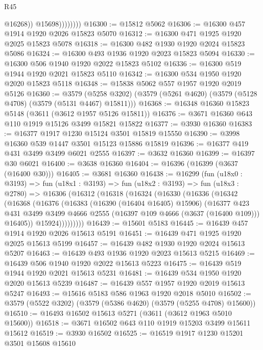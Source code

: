 \begin{lexlean}{R45}
\begin{coremodule}
                        @16268))
                    @15698))))))))
@16300 := @15812 @5062
@16306 := @16300 @457 @1914 @1920 @2026 @15823 @5070
@16312 := @16300 @471 @1925 @1920 @2025 @15823 @5078
@16318 := @16300 @482 @1930 @1920 @2024 @15823 @5086
@16324 := @16300 @493 @1936 @1920 @2023 @15823 @5094
@16330 := @16300 @506 @1940 @1920 @2022 @15823 @5102
@16336 := @16300 @519 @1944 @1920 @2021 @15823 @5110
@16342 := @16300 @534 @1950 @1920 @2020 @15823 @5118
@16348 := @15838 @5062 @557 @1957 @1920 @2019 @5126
@16360 := @3579
    (@5258 @3202)
    (@3579 (@5261 @4620) (@3579 (@5128 @4708) (@3579 (@5131 @4467) @15811)))
@16368 := @16348 @16360 @15823 @5148 (@3611 (@3612 @1957 @5126 @15811))
@16376 := @3671 @16360 @643 @110 @1919 @15126 @3499 @15821 @15822
@16377 := @3930 @16360
@16383 := @16377 @1917 @1230 @15124 @3501 @15819 @15550
@16390 := @3998 @16360 @539 @1447 @3501 @15123 @15886 @15819
@16396 := @16377 @419 @431 @3499 @3499 @6021 @2555
@16397 := @3632 @16360
@16399 := @16397 @30 @6021
@16400 := @3638 @16360
@16404 := @16396 (@16399 (@3637 (@16400 @30)))
@16405 := @3681 @16360
@16438 := @16299
    (fun (u18x0 : @3193) =>
    fun (u18x1 : @3193) =>
    fun (u18x2 : @3193) =>
    fun (u18x3 : @2780) =>
    @16306
      (@16312
        (@16318
          (@16324
            (@16330
              (@16336
                (@16342
                  (@16368
                    (@16376
                      (@16383
                        (@16390 (@16404 @16405) @15906)
                        (@16377
                          @423
                          @431
                          @3499
                          @3499
                          @4666
                          @2555
                          (@16397 @109 @4666 (@3637 (@16400 @109)))
                          @16405))
                      @15924)))))))))
@16439 := @15601 @5183
@16445 := @16439 @457 @1914 @1920 @2026 @15613 @5191
@16451 := @16439 @471 @1925 @1920 @2025 @15613 @5199
@16457 := @16439 @482 @1930 @1920 @2024 @15613 @5207
@16463 := @16439 @493 @1936 @1920 @2023 @15613 @5215
@16469 := @16439 @506 @1940 @1920 @2022 @15613 @5223
@16475 := @16439 @519 @1944 @1920 @2021 @15613 @5231
@16481 := @16439 @534 @1950 @1920 @2020 @15613 @5239
@16487 := @16439 @557 @1957 @1920 @2019 @15613 @5247
@16493 := @15616 @5183 @586 @1963 @1920 @2018 @5010
@16502 := @3579 (@5522 @3202) (@3579 (@5386 @4620) (@3579 (@5255 @4708) @15600))
@16510 := @16493 @16502 @15613 @5271 (@3611 (@3612 @1963 @5010 @15600))
@16518 := @3671 @16502 @643 @110 @1919 @15203 @3499 @15611 @15612
@16519 := @3930 @16502
@16525 := @16519 @1917 @1230 @15201 @3501 @15608 @15610

\end{coremodule}
\end{lexlean}
